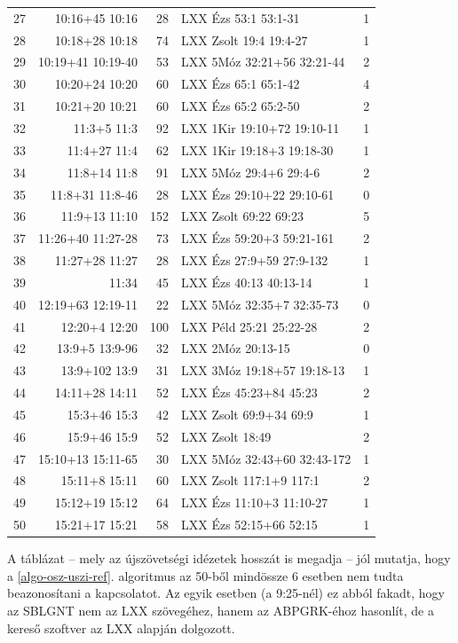 \documentclass{article}
\begin{document}
\begin{longtable}{rrrlc}
27& 10:16+45 10:16&28&LXX Ézs 53:1 53:1-31&1\\
28& 10:18+28 10:18&74&LXX Zsolt 19:4 19:4-27&1\\
29& 10:19+41 10:19-40&53&LXX 5Móz 32:21+56 32:21-44&2\\
30& 10:20+24 10:20&60&LXX Ézs 65:1 65:1-42&4\\
31& 10:21+20 10:21&60&LXX Ézs 65:2 65:2-50&2\\
32& 11:3+5 11:3&92&LXX 1Kir 19:10+72 19:10-11&1\\
33& 11:4+27 11:4&62&LXX 1Kir 19:18+3 19:18-30&1\\
34& 11:8+14 11:8&91&LXX 5Móz 29:4+6 29:4-6&2\\
35& 11:8+31 11:8-46&28&LXX Ézs 29:10+22 29:10-61&0\\
36& 11:9+13 11:10&152&LXX Zsolt 69:22 69:23&5\\
37& 11:26+40 11:27-28&73&LXX Ézs 59:20+3 59:21-161&2\\
38& 11:27+28 11:27&28&LXX Ézs 27:9+59 27:9-132&1\\
39& 11:34&45&LXX Ézs 40:13 40:13-14&1\\
40& 12:19+63 12:19-11&22&LXX 5Móz 32:35+7 32:35-73&0\\
41& 12:20+4 12:20&100&LXX Péld 25:21 25:22-28&2\\
42& 13:9+5 13:9-96&32&LXX 2Móz 20:13-15&0\\
43& 13:9+102 13:9&31&LXX 3Móz 19:18+57 19:18-13&1\\
44& 14:11+28 14:11&52&LXX Ézs 45:23+84 45:23&2\\
45& 15:3+46 15:3&42&LXX Zsolt 69:9+34 69:9&1\\
46& 15:9+46 15:9&52&LXX Zsolt 18:49&2\\
47& 15:10+13 15:11-65&30&LXX 5Móz 32:43+60 32:43-172&1\\
48& 15:11+8 15:11&60&LXX Zsolt 117:1+9 117:1&2\\
49& 15:12+19 15:12&64&LXX Ézs 11:10+3 11:10-27&1\\
50& 15:21+17 15:21&58&LXX Ézs 52:15+66 52:15&1\\
\end{longtable}

A táblázat -- mely az újszövetségi idézetek hosszát is megadja --
jól mutatja, hogy a \ref{algo-osz-uszi-ref}. algoritmus az 50-ből mindössze 6
esetben nem tudta beazonosítani a kapcsolatot. Az egyik esetben (a 9:25-nél) ez abból
fakadt, hogy az SBLGNT nem az LXX szövegéhez, hanem az ABPGRK-éhoz hasonlít, de a kereső
szoftver az LXX alapján dolgozott.
\end{document}
